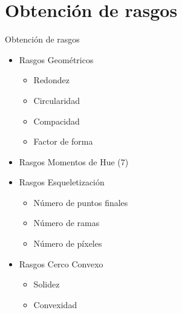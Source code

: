 \documentclass[
  24pt, %
]{beamer}
\begin{document}
\section{Obtención de rasgos}
\begin{frame}{Obtención de rasgos}
  \bigskip %
  \centering
  \begin{itemize}
  \item Rasgos Geométricos
    \pause
    \begin{itemize}
    \item Redondez
    \item Circularidad
    \item Compacidad
    \item Factor de forma
    \end{itemize}
    \pause
  \item Rasgos Momentos de Hue (7)
    \pause
  \item Rasgos Esqueletización
    \pause
    \begin{itemize}
    \item Número de puntos finales
    \item Número de ramas
    \item Número de píxeles
    \end{itemize}
  \item Rasgos Cerco Convexo
    \pause
    \begin{itemize}
    \item Solidez
    \item Convexidad
    \end{itemize}
  \end{itemize}
\end{frame}
\end{document}
